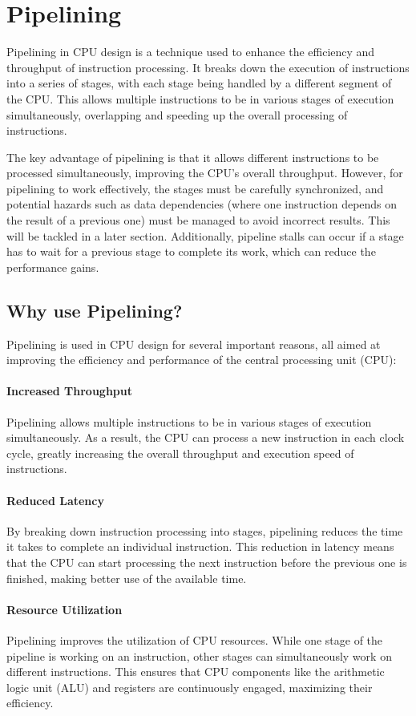 \section{Pipelining}
Pipelining in CPU design is a technique used to enhance the efficiency and throughput of instruction processing.
It breaks down the execution of instructions into a series of stages, with each stage being handled by a different segment of the CPU.
This allows multiple instructions to be in various stages of execution simultaneously, overlapping and speeding up the overall processing of instructions.

The key advantage of pipelining is that it allows different instructions to be processed simultaneously, improving the CPU's overall throughput.
However, for pipelining to work effectively, the stages must be carefully synchronized,
and potential hazards such as data dependencies (where one instruction depends on the result of a previous one) must be managed to avoid incorrect results.
This will be tackled in a later section.
Additionally, pipeline stalls can occur if a stage has to wait for a previous stage to complete its work, which can reduce the performance gains.

\subsection{Why use Pipelining?}
Pipelining is used in CPU design for several important reasons, all aimed at improving the efficiency and performance of the central processing unit (CPU):
\paragraph*{Increased Throughput}
Pipelining allows multiple instructions to be in various stages of execution simultaneously.
As a result, the CPU can process a new instruction in each clock cycle, greatly increasing the overall throughput and execution speed of instructions.
\paragraph*{Reduced Latency}
By breaking down instruction processing into stages, pipelining reduces the time it takes to complete an individual instruction.
This reduction in latency means that the CPU can start processing the next instruction before the previous one is finished,
making better use of the available time.
\paragraph*{Resource Utilization}
Pipelining improves the utilization of CPU resources. While one stage of the pipeline is working on an instruction,
other stages can simultaneously work on different instructions.
This ensures that CPU components like the arithmetic logic unit (ALU) and registers are continuously engaged, maximizing their efficiency.
